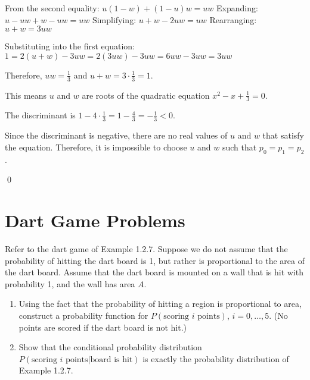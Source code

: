From the second equality: $u(1-w) + (1-u)w = uw$
Expanding: $u - uw + w - uw = uw$
Simplifying: $u + w - 2uw = uw$
Rearranging: $u + w = 3uw$

Substituting into the first equation: $1 = 2(u + w) - 3uw = 2(3uw) - 3uw = 6uw - 3uw = 3uw$

Therefore, $uw = \frac{1}{3}$ and $u + w = 3 \cdot \frac{1}{3} = 1$.

This means $u$ and $w$ are roots of the quadratic equation $x^2 - x + \frac{1}{3} = 0$.

The discriminant is $1 - 4 \cdot \frac{1}{3} = 1 - \frac{4}{3} = -\frac{1}{3} < 0$.

Since the discriminant is negative, there are no real values of $u$ and $w$ that satisfy the equation. Therefore, it is impossible to choose $u$ and $w$ such that $p_0 = p_1 = p_2$.



\qed
\section{Dart Game Problems}

\begin{problembox}
Refer to the dart game of Example 1.2.7. Suppose we do not assume that the probability of hitting the dart board is 1, but rather is proportional to the area of the dart board. Assume that the dart board is mounted on a wall that is hit with probability 1, and the wall has area $A$.
\begin{enumerate}[label=(\alph*)]
    \item Using the fact that the probability of hitting a region is proportional to area, construct a probability function for $P(\text{scoring } i \text{ points})$, $i = 0, \ldots, 5$. (No points are scored if the dart board is not hit.)
    \item Show that the conditional probability distribution $P(\text{scoring } i \text{ points}|\text{board is hit})$ is exactly the probability distribution of Example 1.2.7.
\end{enumerate}
\end{problembox}

